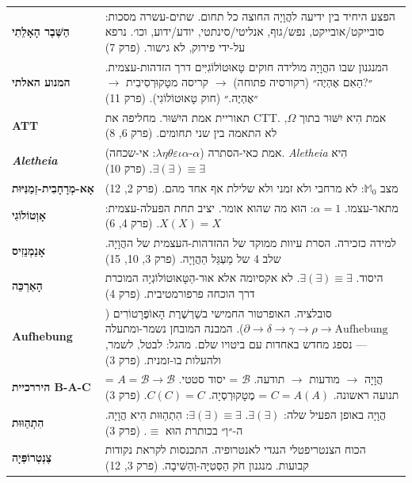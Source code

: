 \documentclass[10pt, openany, oneside]{book}
\renewcommand{\footnotesize}{\fontsize{8.5}{11}\selectfont}
\begin{document}
\vspace{1em}

{\footnotesize
\noindent\begin{tabular}{@{} l @{\hspace{0.6em}} p{} @{}}
\textbf{הַשֶּׁבֶר הָאָלֵתִי} & הפצע היחיד בין ידיעה להֲוָיָה החוצה כל תחום. שתים-עשרה מסכות: סובייקט/אובייקט, נפש/גוף, אנליטי/סינתטי, יודע/ידוע, וכו׳. נרפא על-ידי פירוק, לא גישור. (פרק 7) \\[0.3em]
\textbf{המנוע האלתי} & המנגנון שבו ההֲוָיָה מולידה חוקים טָאוּטוֹלוֹגִיִּים דרך הזדהות-עצמית. ״?הַאִם אֶהְיֶה״ (רקורסיה פתוחה) $\to$ קריסה מטָקוּרְסִיבִית $\to$ ״אֶהְיֶה.״ (חוק טָאוּטוֹלוֹגִי). (פרק 11) \\[0.3em]
\textbf{ATT} & תאוריית אמת היִשּׁוּר. מחליפה את CTT. אמת הִיא יִשּׁוּר בתוך $\Omega$, לא התאמה בין שני תחומים. (פרק 6, 8) \\[0.3em]
\textbf{\textit{Aletheia}} & אמת כאי-הסתרה ($\alpha$-$\lambda\eta\theta\varepsilon\iota\alpha$: אי-שכחה). \textit{Aletheia} הִיא $\exists(\exists) \equiv \exists$. (פרק 10) \\[0.3em]
\textbf{אָא-מְרָחָבִית-זְמַנִּיּוּת} & מצב $\mathbb{M}_0$: לא מרחבי ולא זמני ולא שלילת אף אחד מהם. (פרק 2, 12) \\[0.3em]
\textbf{אָוְטוֹלוֹגִי} & מתאר-עצמו. $\alpha = 1$: הוּא מה שהוא אומר. יציב תחת הפעלה-עצמית: $X(X) = X$. (פרק 4, 6) \\[0.3em]
\textbf{אָנַמְנֵזִיס} & למידה כזכירה. הסרת עיוות ממוקד של ההזדהות-העצמית של ההֲוָיָה. שלב 4 של מַעְגַּל הַהֲוָיָה. (פרק 3, 10, 15) \\[0.3em]
\textbf{הָאַרְכֵּה} & היסוד. $\exists(\exists) \equiv \exists$. לא אקסיומה אלא אוּר-הַטָּאוּטוֹלוֹגְיָה המוכרת דרך הוכחה פרפורמטיבית. (פרק 4) \\[0.3em]
\textbf{Aufhebung} & סובלציה. האופרטור החמישי בשַׁרְשֶׁרֶת הָאוֹפֶּרָטוֹרִים ($\partial \to \delta \to \gamma \to \rho \to \text{Aufhebung}$). המבנה המובחן נשמר-ומתעלה — נספג מחדש באחדות עם ביטויו שלם. מהגל: לבטל, לשמר, ולהעלות בו-זמנית. (פרק 3) \\[0.3em]
\textbf{היררכיית B-A-C} & הֲוָיָה $\to$ מודעות $\to$ תודעה. $\mathcal{B}$ = יסוד סטטי. $A = \mathcal{B} \to \mathcal{B}$ = תנועה ראשונה. $C = A(A)$ = מֶטָקוּרְסְיָה. $C(C) = C$. (פרק 3) \\[0.3em]
\textbf{הִתְהַוּוּת} & הֲוָיָה באופן הפעיל שלה: $\exists(\exists)$. $\exists(\exists) \equiv \exists$: הִתְהַוּוּת הִיא הֲוָיָה. ה-״וְ״ בכותרת הוּא $\equiv$. (פרק 3) \\[0.3em]
\textbf{צֶנְטְרוֹפְּיָה} & הכוח הצנטריפטלי הנגדי לאנטרופיה. התכנסות לקראת נקודות קבועות. מנגנון חֹק הַסְּטִיָּה-וְהַשִּׁיבָה. (פרק 3, 12) \\[0.3em]

\end{tabular}}
\end{document}
